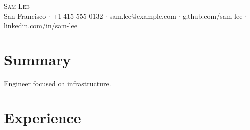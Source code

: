 \documentclass[letterpaper,11pt]{article}
\begin{document}
\begin{center}
{\Huge \scshape Sam Lee} \\ \vspace{5pt}
\small San Francisco $\cdot$ +1 415 555 0132 $\cdot$ sam.lee@example.com $\cdot$ github.com/sam-lee $\cdot$ linkedin.com/in/sam-lee
\end{center}

\section{Summary}
{\small Engineer focused on infrastructure.}

\section{Experience}
\end{document}
